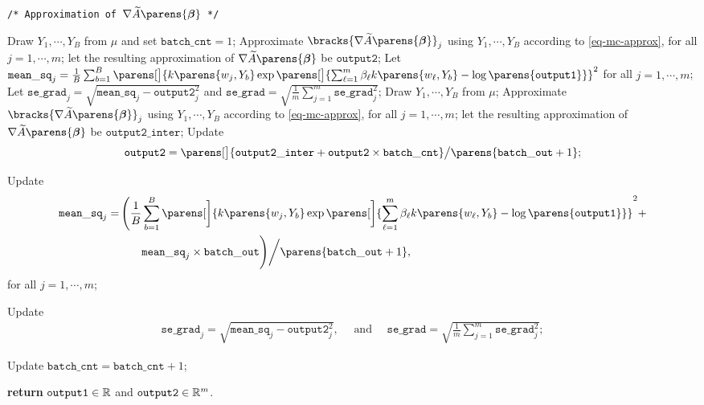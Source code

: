 \begin{algorithm}
\caption*{\textbf{Algorithm 2} Batch Monte Carlo method (continued)}
\begin{algorithmic}[1]


\Statex \noindent \texttt{/* Approximation of $\nabla \widetilde{A} \parens{\bbeta}$ */}

\State Draw $Y_1, \cdots, Y_B$ from $\mu$ and set $\mathtt{batch\_cnt} = 1$; 
\State Approximate $\bracks{\nabla \widetilde{A} \parens{\bbeta}}_j$ using $Y_1, \cdots, Y_B$ according to \eqref{eq-mc-approx}, for all $j = 1, \cdots, m$; let the resulting approximation of $\nabla \widetilde{A} \parens{\bbeta}$ be $\mathtt{output2}$; 
\State Let $\mathtt{mean\_sq}_j = \frac{1}{B} \sum_{b=1}^B \parens[\big]{k \parens{w_{j}, Y_{b}} \exp \parens[\big]{\sum_{\ell=1}^m \beta_{\ell} k \parens{w_\ell, Y_b} - \log \parens{ \mathtt{output1} }}}^2$ for all $j = 1, \cdots, m$; 
\State Let $\mathtt{se\_grad}_j = \sqrt{\mathtt{mean\_sq}_j - \mathtt{output2}_j^2}$ and $\mathtt{se\_grad} = \sqrt{\frac{1}{m} \sum_{j=1}^m \mathtt{se\_grad}_j^2}$; \label{algo-step3}
\State Draw $Y_1, \cdots, Y_B$ from $\mu$; 
\State Approximate $\bracks{\nabla \widetilde{A} \parens{\bbeta}}_j$ using $Y_1, \cdots, Y_B$ according to \eqref{eq-mc-approx}, for all $j = 1, \cdots, m$; let the resulting approximation of $\nabla \widetilde{A} \parens{\bbeta}$ be $\mathtt{output2\_inter}$; 
\State Update 
\begin{align*}
	\mathtt{output2} = \parens[\big]{\mathtt{output2\_inter} + \mathtt{output2} \times \mathtt{batch\_cnt} } \big/ \parens{\mathtt{batch\_out} + 1}; 
\end{align*}

\State Update 
\begin{align*}
	\mathtt{mean\_sq}_j = & \, \Bigg( \frac{1}{B} \sum_{b=1}^B \parens[\bigg]{k \parens{w_{j}, Y_{b}} \exp \parens[\bigg]{\sum_{\ell=1}^m \beta_{\ell} k \parens{w_\ell, Y_b } - \log \parens{\mathtt{output1}}}}^2 + \\
	& \qquad \mathtt{mean\_sq}_j \times \mathtt{batch\_out} \Bigg) \bigg/ \parens{\mathtt{batch\_out} + 1}, 
\end{align*}
for all $j = 1, \cdots, m$; 

\State Update \label{algo-step4}
\begin{align*}
	\mathtt{se\_grad}_j = \sqrt{\mathtt{mean\_sq}_j - \mathtt{output2}_j^2}, \quad \text{ and } \quad \mathtt{se\_grad} = \sqrt{\frac{1}{m}  \sum_{j=1}^m \mathtt{se\_grad}_j^2}; 
\end{align*}

\State Update $\mathtt{batch\_cnt} = \mathtt{batch\_cnt} + 1$; 
\EndWhile 

\State \textbf{return} $\mathtt{output1} \in \mathbb{R}$ and $\mathtt{output2} \in \mathbb{R}^{m}$. 
\end{algorithmic}
\end{algorithm}



